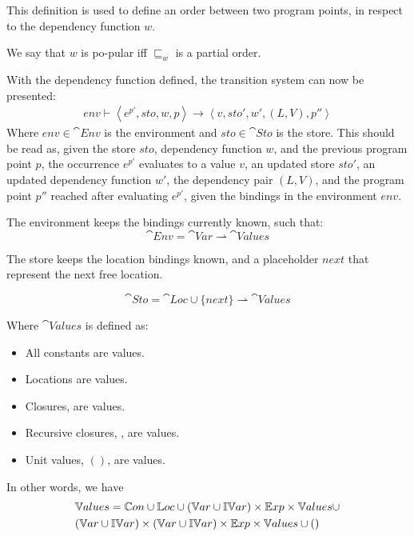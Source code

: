 \documentclass[../../master.tex]{subfiles}
\begin{document}
This definition is used to define an order between two program points, in respect to the dependency function $w$.

\begin{definition}
	We say that $w$ is po-pular iff $\sqsubseteq_w$ is a partial order.
\end{definition}

With the dependency function defined, the transition system can now be presented:
\begin{align*}
env\vdash\left\langle e^{p'},sto,w,p\right\rangle\rightarrow\left\langle v,sto',w',(L,V),p''\right\rangle
\end{align*}
Where $env\in\cat{Env}$ is the environment and $sto\in\cat{Sto}$ is the store.
This should be read as, given the store $sto$, dependency function $w$, and the previous program point $p$, the occurrence $e^{p'}$ evaluates to a value $v$, an updated store $sto'$, an updated dependency function $w'$, the dependency pair $(L,V)$, and the program point $p''$ reached after evaluating $e^{p'}$, given the bindings in the environment $env$.

The environment keeps the bindings currently known, such that:
$$\cat{Env}=\cat{Var}\rightharpoonup\cat{Values}$$

The store keeps the location bindings known, and a placeholder $next$ that represent the next free location.

$$\cat{Sto}=\cat{Loc}\cup\{next\}\rightharpoonup\cat{Values}$$

Where $\cat{Values}$ is defined as:
\begin{itemize}
	\item All constants are values.
	\item Locations are values.
	\item Closures,  are values.
	\item Recursive closures, , are values.
	\item Unit values, $()$, are values.
\end{itemize}
In other words, we have
\begin{align*}
	&\mathbb{V}alues=\mathbb{C}on\cup\mathbb{L}oc\cup(\mathbb{V}ar\cup\mathbb{IV}ar)\times\mathbb{E}xp\times\mathbb{V}alues\cup\\
	&(\mathbb{V}ar\cup\mathbb{IV}ar)\times(\mathbb{V}ar\cup\mathbb{IV}ar)\times\mathbb{E}xp\times\mathbb{V}alues\cup()
\end{align*}
\end{document}
